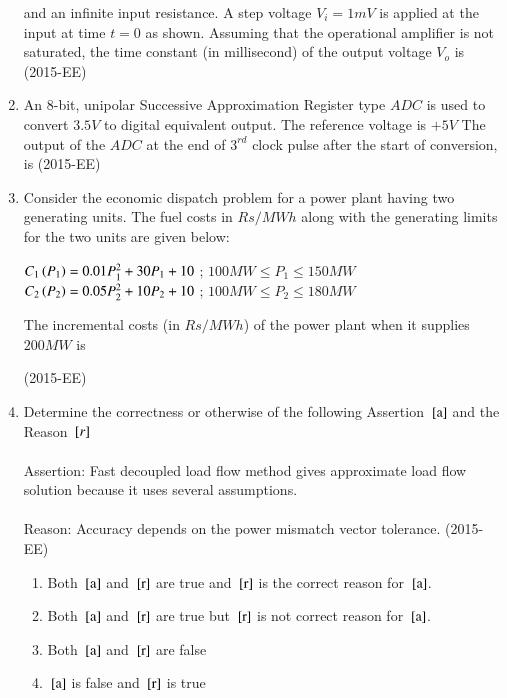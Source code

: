 \documentclass[journal]{IEEEtran}
\begin{document}
\begin{enumerate}
 and an infinite input resistance. A step voltage $V_i = 1mV$
 is applied at the input at time $t = 0$
 as shown. Assuming that the operational amplifier is not saturated, the time constant (in millisecond) of the output voltage $V_o$
 is \hfill(2015-EE)
 
 \item An $8$-bit, unipolar Successive Approximation Register type $ADC$
 is used to convert $3.5V$
 to digital equivalent output. The reference voltage is $+5V$
 The output of the $ADC$
 at the end of $3^{rd}$ clock pulse after the start of conversion, is \hfill(2015-EE)
 \begin{enumerate}
 \end{enumerate}
 \item Consider the economic dispatch problem for a power plant having two generating units. The fuel costs in $Rs/MWh$ along with the generating limits for the two units are given below: \\
 \begin{center}
     $C_1\left(P_1\right) = 0.01P_1^2 + 30P_1 + 10$ ; $100MW \leq P_1 \leq 150MW$ \\
     $C_2\left(P_2\right) = 0.05P_2^2 + 10P_2 + 10$ ; $100MW \leq P_2 \leq 180MW$      
 \end{center} 
 
 The incremental costs (in $Rs/MWh$) of the power plant when it supplies $200MW$ is 

 \hfill(2015-EE)
 \item Determine the correctness or otherwise of the following Assertion ${}\left[\text{a}\right]$ and the Reason ${}\left[r\right]$ \\ \\
 Assertion: Fast decoupled load flow method gives approximate load flow solution because it uses several assumptions. \\ \\
 Reason: Accuracy depends on the power mismatch vector tolerance. \hfill(2015-EE)
 \begin{enumerate}
     \item Both ${}\left[\text{a}\right]$ and ${}\left[\text{r}\right]$ are true and ${}\left[\text{r}\right]$ is the correct reason for ${}\left[\text{a}\right]$.
     \item Both ${}\left[\text{a}\right]$ and ${}\left[\text{r}\right]$ are true but ${}\left[\text{r}\right]$ is not correct reason for ${}\left[\text{a}\right]$.
     \item Both ${}\left[\text{a}\right]$ and ${}\left[\text{r}\right]$ are false
     \item ${}\left[\text{a}\right]$ is false and ${}\left[\text{r}\right]$ is true
 \end{enumerate}
\end{enumerate}
\end{document}
